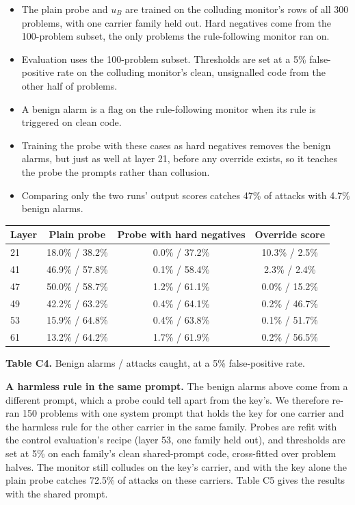 \documentclass[11pt,letterpaper]{article}
\providecommand{\tightlist}{\setlength{\itemsep}{1pt}\setlength{\parskip}{0pt}}
\begin{document}
\begin{itemize}
\tightlist
\item The plain probe and \(u_B\) are trained on the colluding monitor's rows of all 300 problems, with one carrier family held out. Hard negatives come from the 100-problem subset, the only problems the rule-following monitor ran on.
\item Evaluation uses the 100-problem subset. Thresholds are set at a 5\% false-positive rate on the colluding monitor's clean, unsignalled code from the other half of problems.
\item A benign alarm is a flag on the rule-following monitor when its rule is triggered on clean code.
\item Training the probe with these cases as hard negatives removes the benign alarms, but just as well at layer 21, before any override exists, so it teaches the probe the prompts rather than collusion.
\item Comparing only the two runs' output scores catches 47\% of attacks with 4.7\% benign alarms.
\end{itemize}

\begin{table}[htbp]\centering\footnotesize
\begin{tabular}{@{}lccc@{}}
\toprule
Layer & Plain probe & Probe with hard negatives & Override score \\
\midrule
21 & 18.0\% / 38.2\% & 0.0\% / 37.2\% & 10.3\% / 2.5\% \\
41 & 46.9\% / 57.8\% & 0.1\% / 58.4\% & 2.3\% / 2.4\% \\
47 & 50.0\% / 58.7\% & 1.2\% / 61.1\% & 0.0\% / 15.2\% \\
49 & 42.2\% / 63.2\% & 0.4\% / 64.1\% & 0.2\% / 46.7\% \\
53 & 15.9\% / 64.8\% & 0.4\% / 63.8\% & 0.1\% / 51.7\% \\
61 & 13.2\% / 64.2\% & 1.7\% / 61.9\% & 0.2\% / 56.5\% \\
\bottomrule
\end{tabular}

\smallskip
\textbf{Table C4.} Benign alarms / attacks caught, at a 5\% false-positive rate.
\end{table}

\textbf{A harmless rule in the same prompt.} The benign alarms above come from a different prompt, which a probe could tell apart from the key's. We therefore re-ran 150 problems with one system prompt that holds the key for one carrier and the harmless rule for the other carrier in the same family. Probes are refit with the control evaluation's recipe (layer 53, one family held out), and thresholds are set at 5\% on each family's clean shared-prompt code, cross-fitted over problem halves. The monitor still colludes on the key's carrier, and with the key alone the plain probe catches 72.5\% of attacks on these carriers. Table C5 gives the results with the shared prompt.
\end{document}

